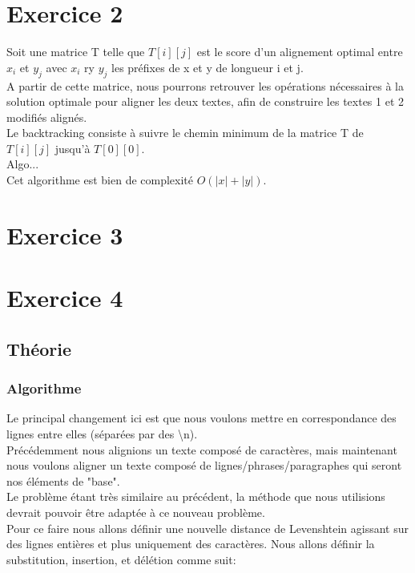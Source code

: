 \documentclass{article}
\begin{document}
\section{Exercice 2}

Soit une matrice T telle que $T[i][j]$ est le score d'un alignement optimal entre $x_{i}$ et $y_{j}$ avec $x_{i}$ ry $y_{j}$ les préfixes de x et y de longueur i et j.\\
A partir de cette matrice, nous pourrons retrouver les opérations nécessaires à la solution optimale pour aligner les deux textes, afin de construire les textes 1 et 2 modifiés alignés.\\
Le backtracking consiste à suivre le chemin minimum de la matrice T de
$T[i][j]$ jusqu'à $T[0][0]$.\\
Algo...\\
Cet algorithme est bien de complexité $O(\lvert x\rvert+\lvert y\rvert)$.

\section{Exercice 3}


\section{Exercice 4}
\subsection{Théorie}
\subsubsection{Algorithme}
Le principal changement ici est que nous voulons mettre en correspondance des
lignes entre elles (séparées par des \textbackslash{}n).\\
Précédemment nous alignions un texte composé de caractères, mais maintenant nous
voulons aligner un texte composé de lignes/phrases/paragraphes qui seront nos
éléments de "base".\\

Le problème étant très similaire au précédent, la méthode que nous utilisions
devrait pouvoir être adaptée à ce nouveau problème.\\
Pour ce faire nous allons définir une nouvelle distance de Levenshtein agissant sur
des lignes entières et plus uniquement des caractères.
Nous allons définir la substitution, insertion, et délétion comme suit:
\end{document}
